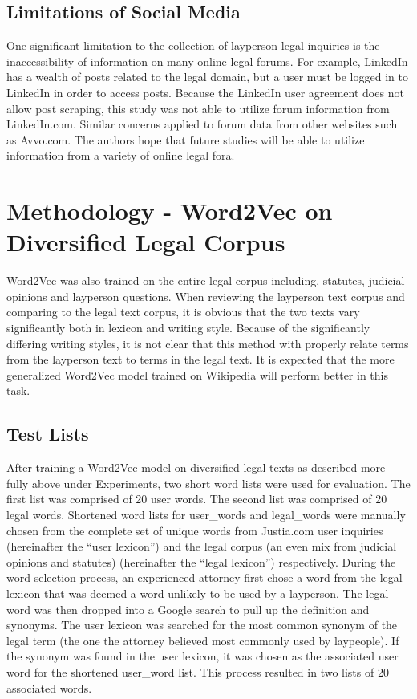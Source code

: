 \documentclass[11pt]{article}
\begin{document}
\subsection {Limitations of Social Media}
One significant limitation to the collection of layperson legal inquiries is the inaccessibility of information on many online legal forums.  For example, LinkedIn has a wealth of posts related to the legal domain, but a user must be logged in to LinkedIn in order to access posts.  Because the LinkedIn user agreement does not allow post scraping, this study was not able to utilize forum information from LinkedIn.com.  Similar concerns applied to forum data from other websites such as Avvo.com.  The authors hope that future studies will be able to utilize information from a variety of online legal fora. 

\section{Methodology - Word2Vec on Diversified Legal Corpus}
Word2Vec was also trained on the entire legal corpus including, statutes, judicial opinions and layperson questions.  When reviewing the layperson text corpus and comparing to the legal text corpus, it is obvious that the two texts vary significantly both in lexicon and writing style.  Because of the significantly differing writing styles, it is not clear that this method with properly relate terms from the layperson text to terms in the legal text.  It is expected that the more generalized Word2Vec model trained on Wikipedia will perform better in this task.

\subsection{Test Lists}
After training a Word2Vec model on diversified legal texts as described more fully above under Experiments, two short word lists were used for evaluation.  The first list was comprised of 20 user words.  The second list was comprised of 20 legal words.  Shortened word lists for user\_words and legal\_words were manually chosen from the complete set of unique words from Justia.com user inquiries (hereinafter the ``user lexicon'') and the legal corpus (an even mix from judicial opinions and statutes) (hereinafter the ``legal lexicon'') respectively.  During the word selection process, an experienced attorney first chose a word from the legal lexicon that was deemed a word unlikely to be used by a layperson.  The legal word was then dropped into a Google search to pull up the definition and synonyms.  The user lexicon was searched for the most common synonym of the legal term (the one the attorney believed most commonly used by laypeople).  If the synonym was found in the user lexicon, it was chosen as the associated user word for the shortened user\_word list.  This process resulted in two lists of 20 associated words.  
\end{document}
